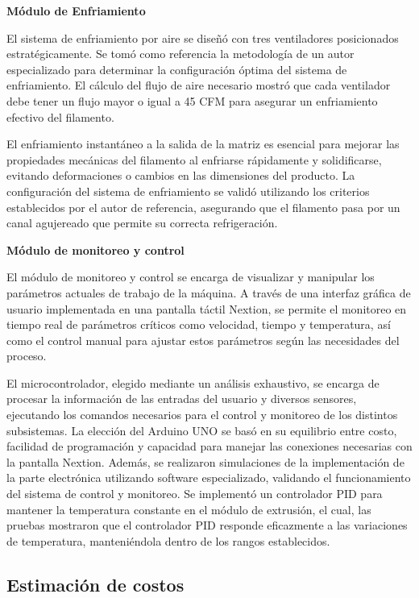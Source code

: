 \documentclass[14pt,oneside]{extarticle} %
\begin{document}
\textbf{Módulo de Enfriamiento}

El sistema de enfriamiento por aire se diseñó con tres ventiladores posicionados estratégicamente. Se tomó como referencia la metodología de un autor especializado para determinar la configuración óptima del sistema de enfriamiento. El cálculo del flujo de aire necesario mostró que cada ventilador debe tener un flujo mayor o igual a 45 CFM para asegurar un enfriamiento efectivo del filamento.

El enfriamiento instantáneo a la salida de la matriz es esencial para mejorar las propiedades mecánicas del filamento al enfriarse rápidamente y solidificarse, evitando deformaciones o cambios en las dimensiones del producto. La configuración del sistema de enfriamiento se validó utilizando los criterios establecidos por el autor de referencia, asegurando que el filamento pasa por un canal agujereado que permite su correcta refrigeración.

\textbf{Módulo de monitoreo y control}

El módulo de monitoreo y control se encarga de visualizar y manipular los parámetros actuales de trabajo de la máquina. A través de una interfaz gráfica de usuario implementada en una pantalla táctil Nextion, se permite el monitoreo en tiempo real de parámetros críticos como velocidad, tiempo y temperatura, así como el control manual para ajustar estos parámetros según las necesidades del proceso.

El microcontrolador, elegido mediante un análisis exhaustivo, se encarga de procesar la información de las entradas del usuario y diversos sensores, ejecutando los comandos necesarios para el control y monitoreo de los distintos subsistemas. La elección del Arduino UNO se basó en su equilibrio entre costo, facilidad de programación y capacidad para manejar las conexiones necesarias con la pantalla Nextion. Además, se realizaron simulaciones de la implementación de la parte electrónica utilizando software especializado, validando el funcionamiento del sistema de control y monitoreo. Se implementó un controlador PID para mantener la temperatura constante en el módulo de extrusión, el cual, las pruebas mostraron que el controlador PID responde eficazmente a las variaciones de temperatura, manteniéndola dentro de los rangos establecidos.


\subsection{Estimación de costos}
\end{document}
